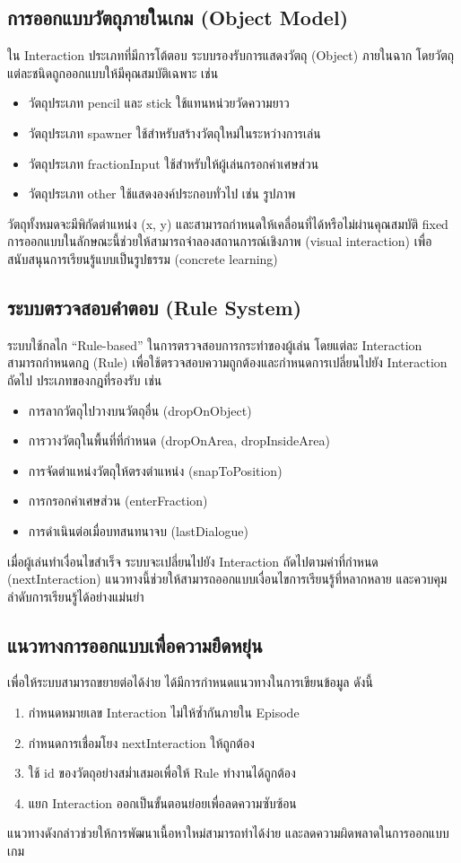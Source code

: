 \subsection{การออกแบบวัตถุภายในเกม (Object Model)}
ใน Interaction ประเภทที่มีการโต้ตอบ ระบบรองรับการแสดงวัตถุ (Object) ภายในฉาก โดยวัตถุแต่ละชนิดถูกออกแบบให้มีคุณสมบัติเฉพาะ เช่น
\begin{itemize}
    \item วัตถุประเภท pencil และ stick ใช้แทนหน่วยวัดความยาว
    \item วัตถุประเภท spawner ใช้สำหรับสร้างวัตถุใหม่ในระหว่างการเล่น
    \item วัตถุประเภท fractionInput ใช้สำหรับให้ผู้เล่นกรอกค่าเศษส่วน
    \item วัตถุประเภท other ใช้แสดงองค์ประกอบทั่วไป เช่น รูปภาพ
\end{itemize}
วัตถุทั้งหมดจะมีพิกัดตำแหน่ง (x, y) และสามารถกำหนดให้เคลื่อนที่ได้หรือไม่ผ่านคุณสมบัติ fixed 
การออกแบบในลักษณะนี้ช่วยให้สามารถจำลองสถานการณ์เชิงภาพ (visual interaction) เพื่อสนับสนุนการเรียนรู้แบบเป็นรูปธรรม (concrete learning)

\subsection{ระบบตรวจสอบคำตอบ (Rule System)}
ระบบใช้กลไก “Rule-based” ในการตรวจสอบการกระทำของผู้เล่น โดยแต่ละ Interaction สามารถกำหนดกฎ (Rule) เพื่อใช้ตรวจสอบความถูกต้องและกำหนดการเปลี่ยนไปยัง Interaction ถัดไป 
ประเภทของกฎที่รองรับ เช่น
\begin{itemize}
    \item การลากวัตถุไปวางบนวัตถุอื่น (dropOnObject)
    \item การวางวัตถุในพื้นที่ที่กำหนด (dropOnArea, dropInsideArea)
    \item การจัดตำแหน่งวัตถุให้ตรงตำแหน่ง (snapToPosition)
    \item การกรอกค่าเศษส่วน (enterFraction)
    \item การดำเนินต่อเมื่อบทสนทนาจบ (lastDialogue)
\end{itemize}
เมื่อผู้เล่นทำเงื่อนไขสำเร็จ ระบบจะเปลี่ยนไปยัง Interaction ถัดไปตามค่าที่กำหนด (nextInteraction) แนวทางนี้ช่วยให้สามารถออกแบบเงื่อนไขการเรียนรู้ที่หลากหลาย และควบคุมลำดับการเรียนรู้ได้อย่างแม่นยำ

\subsection{แนวทางการออกแบบเพื่อความยืดหยุ่น}
เพื่อให้ระบบสามารถขยายต่อได้ง่าย ได้มีการกำหนดแนวทางในการเขียนข้อมูล ดังนี้
\begin{enumerate}
    \item กำหนดหมายเลข Interaction ไม่ให้ซ้ำกันภายใน Episode
    \item กำหนดการเชื่อมโยง nextInteraction ให้ถูกต้อง
    \item ใช้ id ของวัตถุอย่างสม่ำเสมอเพื่อให้ Rule ทำงานได้ถูกต้อง
    \item แยก Interaction ออกเป็นขั้นตอนย่อยเพื่อลดความซับซ้อน
\end{enumerate}
แนวทางดังกล่าวช่วยให้การพัฒนาเนื้อหาใหม่สามารถทำได้ง่าย และลดความผิดพลาดในการออกแบบเกม

